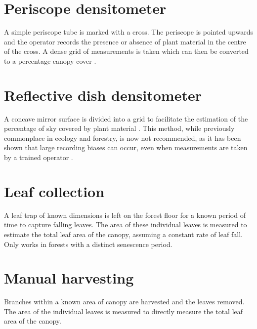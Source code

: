 \documentclass[11pt,a4paper]{article}
\begin{document}
\section{Periscope densitometer}

A simple periscope tube is marked with a cross. The periscope is pointed upwards and the operator records the presence or absence of plant material in the centre of the cross. A dense grid of measurements is taken which can then be converted to a percentage canopy cover \citep{GRS}.

\section{Reflective dish densitometer}

A concave mirror surface is divided into a grid to facilitate the estimation of the percentage of sky covered by plant material \citep{Lemmon1956}. This method, while previously commonplace in ecology and forestry, is now not recommended, as it has been shown that large recording biases can occur, even when measurements are taken by a trained operator \citep{Korhonen2006}.

\section{Leaf collection}

A leaf trap of known dimensions is left on the forest floor for a known period of time to capture falling leaves. The area of these individual leaves is measured to estimate the total leaf area of the canopy, assuming a constant rate of leaf fall. Only works in forests with a distinct senescence period.

\section{Manual harvesting}

Branches within a known area of canopy are harvested and the leaves removed. The area of the individual leaves is measured to directly measure the total leaf area of the canopy.

\printbibliography
\end{document}
